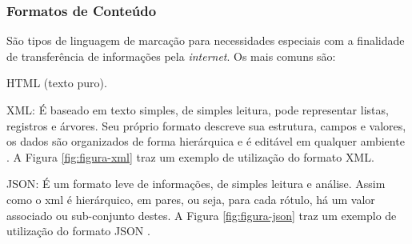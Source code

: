     	\subsubsection{Formatos de Conteúdo}
    	\label{sec:formatos-de-conteudo}
    	São tipos de linguagem de marcação para necessidades especiais com a finalidade de transferência de informações pela \textit{internet}. Os mais comuns são:
    	
        \begin{alineascomponto}
        	\item \gls{HTML} (texto puro).
            \item \gls{XML}:  É baseado em texto simples, de simples leitura, pode representar listas, registros e árvores. Seu próprio formato descreve sua estrutura, campos e valores, os dados são organizados de forma hierárquica e é editável em qualquer ambiente \cite{XML}. A Figura \ref{fig:figura-xml} traz um exemplo de utilização do formato \gls{XML}.
                \begin{figure}[!h]
        	    \end{figure}
            \item \gls{JSON}: É um formato leve de informações, de simples leitura e análise. Assim como o \gls{xml} é hierárquico, em pares, ou seja, para cada rótulo, há um valor associado ou sub-conjunto destes. A Figura \ref{fig:figura-json} traz um exemplo de utilização do formato \gls{JSON} \cite{JSON}.
                \begin{figure}[!h]

\end{figure}
\end{alineascomponto}
